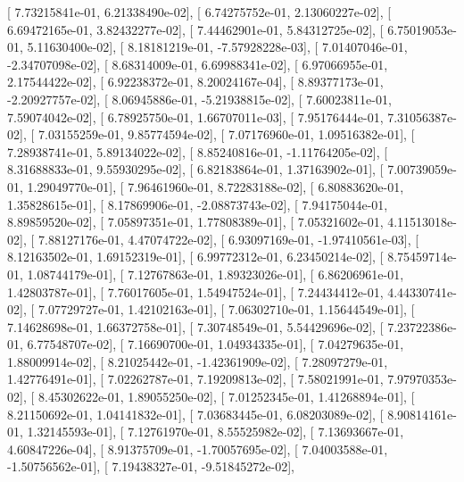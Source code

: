 \documentclass{article}
\begin{document}
       [  7.73215841e-01,   6.21338490e-02],
       [  6.74275752e-01,   2.13060227e-02],
       [  6.69472165e-01,   3.82432277e-02],
       [  7.44462901e-01,   5.84312725e-02],
       [  6.75019053e-01,   5.11630400e-02],
       [  8.18181219e-01,  -7.57928228e-03],
       [  7.01407046e-01,  -2.34707098e-02],
       [  8.68314009e-01,   6.69988341e-02],
       [  6.97066955e-01,   2.17544422e-02],
       [  6.92238372e-01,   8.20024167e-04],
       [  8.89377173e-01,  -2.20927757e-02],
       [  8.06945886e-01,  -5.21938815e-02],
       [  7.60023811e-01,   7.59074042e-02],
       [  6.78925750e-01,   1.66707011e-03],
       [  7.95176444e-01,   7.31056387e-02],
       [  7.03155259e-01,   9.85774594e-02],
       [  7.07176960e-01,   1.09516382e-01],
       [  7.28938741e-01,   5.89134022e-02],
       [  8.85240816e-01,  -1.11764205e-02],
       [  8.31688833e-01,   9.55930295e-02],
       [  6.82183864e-01,   1.37163902e-01],
       [  7.00739059e-01,   1.29049770e-01],
       [  7.96461960e-01,   8.72283188e-02],
       [  6.80883620e-01,   1.35828615e-01],
       [  8.17869906e-01,  -2.08873743e-02],
       [  7.94175044e-01,   8.89859520e-02],
       [  7.05897351e-01,   1.77808389e-01],
       [  7.05321602e-01,   4.11513018e-02],
       [  7.88127176e-01,   4.47074722e-02],
       [  6.93097169e-01,  -1.97410561e-03],
       [  8.12163502e-01,   1.69152319e-01],
       [  6.99772312e-01,   6.23450214e-02],
       [  8.75459714e-01,   1.08744179e-01],
       [  7.12767863e-01,   1.89323026e-01],
       [  6.86206961e-01,   1.42803787e-01],
       [  7.76017605e-01,   1.54947524e-01],
       [  7.24434412e-01,   4.44330741e-02],
       [  7.07729727e-01,   1.42102163e-01],
       [  7.06302710e-01,   1.15644549e-01],
       [  7.14628698e-01,   1.66372758e-01],
       [  7.30748549e-01,   5.54429696e-02],
       [  7.23722386e-01,   6.77548707e-02],
       [  7.16690700e-01,   1.04934335e-01],
       [  7.04279635e-01,   1.88009914e-02],
       [  8.21025442e-01,  -1.42361909e-02],
       [  7.28097279e-01,   1.42776491e-01],
       [  7.02262787e-01,   7.19209813e-02],
       [  7.58021991e-01,   7.97970353e-02],
       [  8.45302622e-01,   1.89055250e-02],
       [  7.01252345e-01,   1.41268894e-01],
       [  8.21150692e-01,   1.04141832e-01],
       [  7.03683445e-01,   6.08203089e-02],
       [  8.90814161e-01,   1.32145593e-01],
       [  7.12761970e-01,   8.55525982e-02],
       [  7.13693667e-01,   4.60847226e-04],
       [  8.91375709e-01,  -1.70057695e-02],
       [  7.04003588e-01,  -1.50756562e-01],
       [  7.19438327e-01,  -9.51845272e-02],
\end{document}
